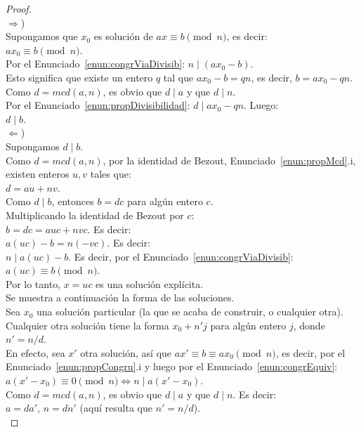 \begin{proof} \, \\
$\Rightarrow$) \\
Supongamos que $x_0$ es solución de $ax\equiv b \pmod n$, es decir: \\
$ax_0 \equiv b \pmod n$. \\
Por el Enunciado~\ref{enun:congrViaDivisib}: $n \mid (ax_0-b)$. \\
Esto significa que existe un entero $q$ tal que
$ax_0 - b = qn $, es decir, $b = ax_0 - qn$. \\
Como $d = mcd(a,n)$, es obvio que $d \mid a$ y que $d \mid n$. \\
Por el Enunciado~\ref{enun:propDivisibilidad}: $d \mid ax_0-qn$. Luego: \\
$d\mid b$. \\
$\Leftarrow$) \\
Supongamos $d\mid b$. \\
Como $d = mcd(a,n)$, por la identidad de Bezout, Enunciado~\ref{enun:propMcd}.i, existen enteros $u,v$ tales que: \\
$d = au + nv$. \\
Como $d\mid b$, entonces $b = dc$ para algún entero $c$. \\
Multiplicando la identidad de Bezout por $c$: \\
$b = dc = auc + nvc$. Es decir: \\
$a(uc) - b = n(-vc)$. Es decir: \\
$ n \mid a(uc) - b$. Es decir, por el Enunciado~\ref{enun:congrViaDivisib}: \\
$a(uc)\equiv b\pmod n$.\\
Por lo tanto, $x=uc$ es una solución explícita. \\
Se muestra a continuación la forma de las soluciones. \\
Sea $x_0$ una solución particular (la que se acaba de construir, o cualquier otra). \\
Cualquier otra solución tiene la forma $x_0 + n'j$ para algún entero $j$, donde $n'=n/d$.\\
En efecto, sea $x'$ otra solución, así que $ax'\equiv b\equiv ax_0\pmod n$, es decir, por el Enunciado~\ref{enun:propCongru}.i y luego por el Enunciado~\ref{enun:congrEquiv}: \\
$a(x'-x_0)\equiv 0\pmod n \iff n\mid a(x'-x_0)$. \\
Como $d = mcd(a,n)$, es obvio que $d \mid a$ y que $d \mid n$. Es decir:\\
$a=da'$, $n=dn'$ (aquí resulta que $n'=n/d$). \\

\end{proof}
